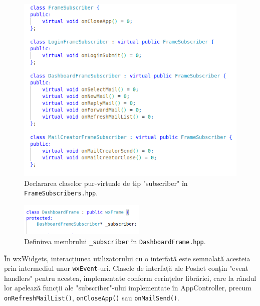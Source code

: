 \documentclass[runningheads]{llncs}
\begin{document}
\begin{figure}
    \centering
    \includegraphics[width=\textwidth]{subscribers.png}
    \caption{Declararea claselor pur-virtuale de tip "subscriber" în \texttt{FrameSubscribers.hpp}.}
    \label{fig:subscribers}
\end{figure}


\begin{figure}
    \centering
    \includegraphics[width={230px}]{subscriberMember.png}
    \caption{Definirea membrului \texttt{\_subscriber} în \texttt{DashboardFrame.hpp}.}
    \label{fig:subscriberMember}
\end{figure}

\newpage

În wxWidgets, interacțiunea utilizatorului cu o interfață este semnalată acesteia prin intermediul unor \texttt{wxEvent}-uri. Clasele de interfață ale Poshet conțin "event handlers" pentru acestea, implementate conform cerințelor librăriei, care la rândul lor apelează funcții ale "subscriber"-ului implementate în AppController, precum \texttt{onRefreshMailList()}, \texttt{onCloseApp()} sau \texttt{onMailSend()}.
\end{document}
